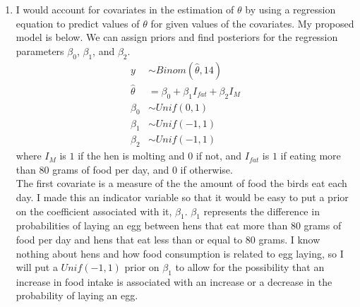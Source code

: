 \documentclass[11pt]{article}\usepackage[]{graphicx}\usepackage[]{color}
\begin{document}
\begin{doublespacing}
\begin{enumerate}
\begin{enumerate}
\item I would account for covariates in the estimation of $\theta$ by using a regression equation to predict values of $\theta$ for given values of the covariates. My proposed model is below. We can assign priors and find posteriors for the regression parameters $\beta_0$, $\beta_1$, and $\beta_2$. 
\begin{align*}
y &\sim Binom(\hat{\theta}, 14) \\
\hat{\theta} &= \beta_0+\beta_1I_{fat}+\beta_2I_{M} \\
\beta_0 &\sim Unif(0, 1) \\
\beta_1 &\sim Unif(-1, 1) \\
\beta_2 &\sim Unif(-1, 1)
\end{align*}
where $I_M$ is $1$ if the hen is molting and $0$ if not, and $I_{fat}$ is $1$ if eating more than $80$ grams of food per day, and $0$ if otherwise. \\

The first covariate is a measure of the the amount of food the birds eat each day. I made this an indicator variable so that it would be easy to put a prior on the coefficient associated with it, $\beta_1$. $\beta_1$ represents the difference in probabilities of laying an egg between hens that eat more than $80$ grams of food per day and hens that eat less than or equal to 80 grams. I know nothing about hens and how food consumption is related to egg laying, so I will put a $Unif(-1, 1)$ prior on $\beta_1$ to allow for the possibility that an increase in food intake is associated with an increase or a decrease in the probability of laying an egg. \\




\end{enumerate}
\end{enumerate}
\end{doublespacing}
\end{document}
